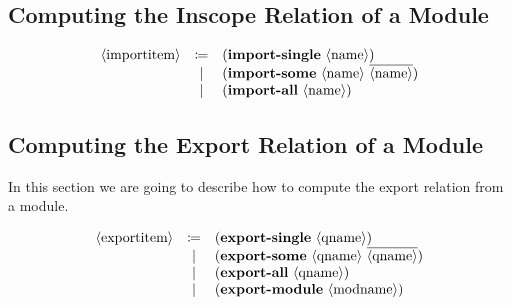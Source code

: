 
\subsection{Computing the Inscope Relation of a Module}
\label{subsec:module-system:inscope}

\[
  \begin{array}{rcl}
    \nonterminal{importitem} & \coloneqq & (\terminal{import-single}\ \nonterminal{name}) \\
    & \mid & (\terminal{import-some}\ \nonterminal{name}\ \overline{\nonterminal{name}}) \\
    & \mid & (\terminal{import-all}\ \nonterminal{name})
  \end{array}
\]

\begin{prooftree}
\end{prooftree}

\begin{prooftree}
\end{prooftree}

\begin{prooftree}
\end{prooftree}

\subsection{Computing the Export Relation of a Module}
\label{subsec:module-system:export}

In this section we are going to describe how to compute the export relation from a module.

\[
  \begin{array}{rcl}
    \nonterminal{exportitem} & \coloneqq & (\terminal{export-single}\ \nonterminal{qname}) \\
    & \mid & (\terminal{export-some}\ \nonterminal{qname}\ \overline{\nonterminal{qname}}) \\
    & \mid & (\terminal{export-all}\ \nonterminal{qname}) \\
    & \mid & (\terminal{export-module}\ \nonterminal{modname})
  \end{array}
\]

